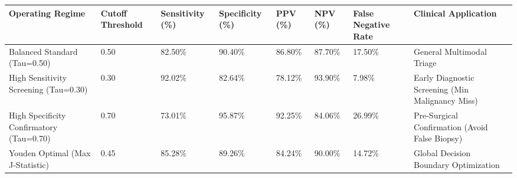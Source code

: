 \begin{tabular}{llllllll}
\toprule
Operating Regime & Cutoff Threshold & Sensitivity (\%) & Specificity (\%) & PPV (\%) & NPV (\%) & False Negative Rate & Clinical Application \\
\midrule
Balanced Standard (Tau=0.50) & 0.50 & 82.50\% & 90.40\% & 86.80\% & 87.70\% & 17.50\% & General Multimodal Triage \\
High Sensitivity Screening (Tau=0.30) & 0.30 & 92.02\% & 82.64\% & 78.12\% & 93.90\% & 7.98\% & Early Diagnostic Screening (Min Malignancy Miss) \\
High Specificity Confirmatory (Tau=0.70) & 0.70 & 73.01\% & 95.87\% & 92.25\% & 84.06\% & 26.99\% & Pre-Surgical Confirmation (Avoid False Biopsy) \\
Youden Optimal (Max J-Statistic) & 0.45 & 85.28\% & 89.26\% & 84.24\% & 90.00\% & 14.72\% & Global Decision Boundary Optimization \\
\bottomrule
\end{tabular}
